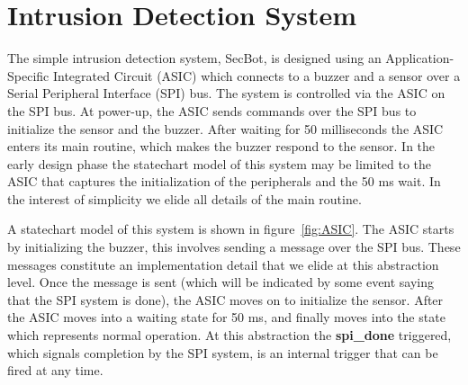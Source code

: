 

\section{Intrusion Detection System}
\label{sec:secbot}


The simple intrusion detection system, SecBot, is designed using an Application-Specific Integrated Circuit (ASIC) which connects to a buzzer and a sensor over a Serial Peripheral Interface (SPI) bus. The system is controlled via the ASIC on the SPI bus. At power-up, the ASIC sends commands over the SPI bus to initialize the sensor and the buzzer. After waiting for 50 milliseconds the ASIC enters its main routine, which makes the buzzer respond to the sensor. In the early design phase the statechart model of this system may be limited to the ASIC that captures the initialization of the peripherals and the 50 ms wait. In the interest of simplicity we elide all details of the main routine.

A statechart model of this system is shown in figure~\ref{fig:ASIC}. The ASIC starts by initializing the buzzer, this involves sending a message over the SPI bus. These messages constitute an implementation detail that we elide at this abstraction level. Once the message is sent (which will be indicated by some event saying that the SPI system is done), the ASIC moves on to initialize the sensor. After the ASIC moves into a waiting state for 50 ms, and finally moves into the state which represents normal operation. At this abstraction the \textbf{spi\_done} triggered, which signals completion by the SPI system, is an internal trigger that can be fired at any time.


